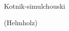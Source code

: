 \documentclass[fleqn,10pt]{article}
\begin{document}
Kotnik-simulchouski 

(Helmholz)










\end{document}
